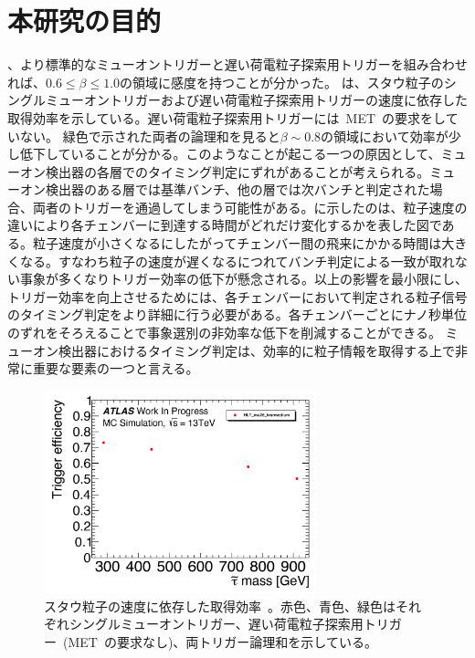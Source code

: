 \section{本研究の目的}
、より標準的なミューオントリガーと遅い荷電粒子探索用トリガーを組み合わせれば、$0.6{\leq}\beta{\leq}1.0$の領域に感度を持つことが分かった。
は、スタウ粒子のシングルミューオントリガーおよび遅い荷電粒子探索用トリガーの速度に依存した取得効率を示している。遅い荷電粒子探索用トリガーには~MET~の要求をしていない。
緑色で示された両者の論理和を見ると$\beta\sim0.8$の領域において効率が少し低下していることが分かる。このようなことが起こる一つの原因として、ミューオン検出器の各層でのタイミング判定にずれがあることが考えられる。ミューオン検出器のある層では基準バンチ、他の層では次バンチと判定された場合、両者のトリガーを通過してしまう可能性がある。に示したのは、粒子速度の違いにより各チェンバーに到達する時間がどれだけ変化するかを表した図である。粒子速度が小さくなるにしたがってチェンバー間の飛来にかかる時間は大きくなる。すなわち粒子の速度が遅くなるにつれてバンチ判定による一致が取れない事象が多くなりトリガー効率の低下が懸念される。以上の影響を最小限にし、トリガー効率を向上させるためには、各チェンバーにおいて判定される粒子信号のタイミング判定をより詳細に行う必要がある。各チェンバーごとにナノ秒単位のずれをそろえることで事象選別の非効率な低下を削減することができる。
ミューオン検出器におけるタイミング判定は、効率的に粒子情報を取得する上で非常に重要な要素の一つと言える。
\begin{figure}[H]
        \centering   
        \includegraphics[width=0.7\textwidth,page=4]{img/pdf3/sumi.pdf}
        \caption[スタウ粒子の速度に依存した取得効率]{スタウ粒子の速度に依存した取得効率~\cite{MT:01}。赤色、青色、緑色はそれぞれシングルミューオントリガー、遅い荷電粒子探索用トリガー~(MET~の要求なし)、両トリガー論理和を示している。}
        \label{fig:sumi4}
\end{figure}
